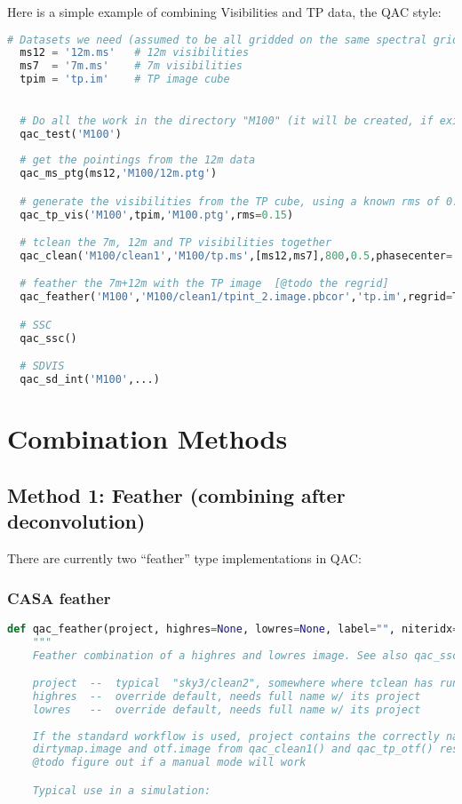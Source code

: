 \documentclass[12pt,a4paper]{article}
\begin{document}
Here is a simple example of combining Visibilities and TP data, the QAC style:

\begin{lstlisting}[language=Python]
  # Datasets we need (assumed to be all gridded on the same spectral grid)
  ms12 = '12m.ms'   # 12m visibilities
  ms7  = '7m.ms'    # 7m visibilities
  tpim = 'tp.im'    # TP image cube

  
  # Do all the work in the directory "M100" (it will be created, if exists, all contents removed)
  qac_test('M100')
  
  # get the pointings from the 12m data
  qac_ms_ptg(ms12,'M100/12m.ptg')

  # generate the visibilities from the TP cube, using a known rms of 0.15 Jy/beam in the TP cube
  qac_tp_vis('M100',tpim,'M100.ptg',rms=0.15)

  # tclean the 7m, 12m and TP visibilities together
  qac_clean('M100/clean1','M100/tp.ms',[ms12,ms7],800,0.5,phasecenter='J2000 12h22m54.900s +15d49m15.000s',niter=[0,10000])

  # feather the 7m+12m with the TP image  [@todo the regrid]
  qac_feather('M100','M100/clean1/tpint_2.image.pbcor','tp.im',regrid=True)

  # SSC
  qac_ssc()

  # SDVIS
  qac_sd_int('M100',...)

\end{lstlisting}


\section{Combination Methods}

\subsection{Method 1: Feather (combining after deconvolution)}

There are currently two ``feather'' type implementations in QAC:

\subsubsection{CASA feather}

\begin{lstlisting}[language=Python]
def qac_feather(project, highres=None, lowres=None, label="", niteridx=0, name="dirtymap"):
    """
    Feather combination of a highres and lowres image. See also qac_ssc()

    project  --  typical  "sky3/clean2", somewhere where tclean has run
    highres  --  override default, needs full name w/ its project
    lowres   --  override default, needs full name w/ its project
    
    If the standard workflow is used, project contains the correctly named
    dirtymap.image and otf.image from qac_clean1() and qac_tp_otf() resp.
    @todo figure out if a manual mode will work

    Typical use in a simulation:
\end{lstlisting}
\end{document}
